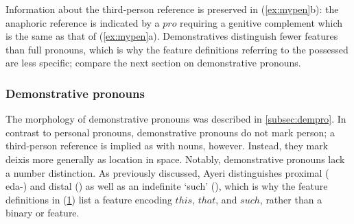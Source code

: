 Information about the third-person reference is preserved in (\ref{ex:mypen}b):
the anaphoric reference is indicated by a $pro$ requiring a genitive complement
which is the same as that of (\ref{ex:mypen}a). Demonstratives distinguish
fewer features than full pronouns, which is why the feature definitions
referring to the possessed are less specific; compare the next section on
demonstrative pronouns.


\subsubsection{Demonstrative pronouns}
\label{subsubsec:demprosyn}

The morphology of demonstrative pronouns was described in 
\autoref{subsec:dempro}. In contrast to personal pronouns, demonstrative
pronouns do not mark person; a third-person reference is implied as with
nouns, however. Instead, they mark deixis more generally as location in space.
Notably, demonstrative pronouns lack a number distinction. As previously
discussed, Ayeri distinguishes proximal ( {eda-}) and distal
() as well as an indefinite `such' (), which is
why the feature definitions in (\ref{ex:dempromorphlex}) list a \Deix{} feature
encoding $this$, $that$, and $such$, rather than a binary \Prox{} or \Dist{}
feature.

\begin{figure}[h]
\begin{morphlex}
\ex\label{ex:dempromorphlex}
\xe
\end{morphlex}
\end{figure}


